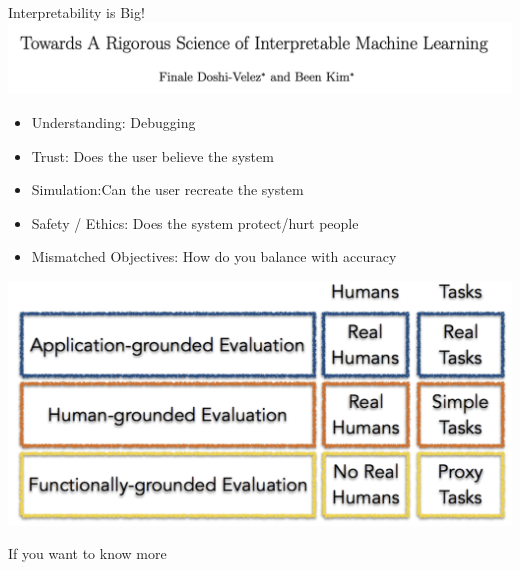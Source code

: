 \documentclass[compress]{beamer}
\newcommand{\fsi}[2]{
\begin{frame}[plain]
\vspace*{-1pt}
\makebox[\linewidth]{\texttt{[image: \#1]}}
\begin{center}
#2
\end{center}
\end{frame}
}
\begin{document}
\begin{frame}{Interpretability is Big!}
  \includegraphics[width=0.9\paperwidth]{general_figures/doshi-velez_kim}

  \begin{itemize}
  \item Understanding: Debugging
  \item Trust: Does the user believe the system
  \item Simulation:Can the user recreate the system
  \item Safety / Ethics: Does the system protect/hurt people
  \item Mismatched Objectives: How do you balance with accuracy
  \end{itemize}

  \begin{center}
    \includegraphics[width=0.5\paperwidth]{general_figures/interpretability_hierarchy}
    \end{center}
\end{frame}


\fsi{general_figures/chenhao_tutorial}{If you want to know more}
\end{document}
